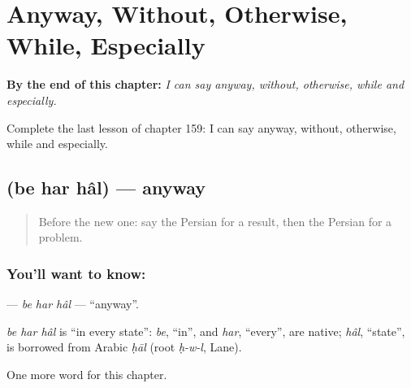 
\chapter{Anyway, Without, Otherwise, While, Especially}
\label{ch:fa-anyway-without-otherwise-while-especially}

\begin{chapteropening}
\textbf{By the end of this chapter:} \emph{I can say anyway, without, otherwise, while and especially.}

Complete the last lesson of chapter 159: I can say anyway, without, otherwise, while and especially.
\end{chapteropening}

\section[\texorpdfstring{\fa{به} \fa{هر} \fa{حال} (be har hâl)}{به هر حال (be har hâl)}]{   (be har hâl) — anyway}

\label{lesson:FA-C159-be-har-hal}



\begin{quote}
Before the new one: say the Persian for a result, then the Persian for a problem.
\end{quote}

\subsection*{You'll want to know:   }
\textbf{  } — \emph{be har hâl} — \textquotedblleft{}anyway\textquotedblright{}.

\begin{cousinweb}
\emph{be har hâl} is \textquotedblleft{}in every state\textquotedblright{}: \emph{be}, \textquotedblleft{}in\textquotedblright{}, and \emph{har}, \textquotedblleft{}every\textquotedblright{}, are native; \emph{hâl}, \textquotedblleft{}state\textquotedblright{}, is borrowed from Arabic \emph{ḥāl} (root \emph{ḥ-w-l}, Lane).
\end{cousinweb}

\begin{grammarlens}[title={What you've built}]
One more word for this chapter.
\end{grammarlens}

